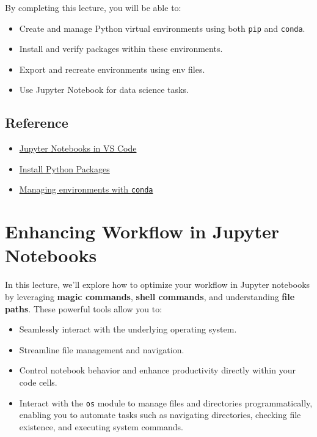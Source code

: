 \documentclass[
  letterpaper,
  DIV=11,
  numbers=noendperiod]{scrreprt}
\providecommand{\tightlist}{%
  \setlength{\itemsep}{0pt}\setlength{\parskip}{0pt}}\usepackage{longtable,booktabs,array}
\begin{document}
By completing this lecture, you will be able to:

\begin{itemize}
\tightlist
\item
  Create and manage Python virtual environments using both \texttt{pip}
  and \texttt{conda}.
\item
  Install and verify packages within these environments.
\item
  Export and recreate environments using env files.
\item
  Use Jupyter Notebook for data science tasks.
\end{itemize}

\hypertarget{reference}{%
\section{Reference}\label{reference}}

\begin{itemize}
\tightlist
\item
  \href{https://code.visualstudio.com/docs/datascience/jupyter-notebooks}{Jupyter
  Notebooks in VS Code}
\item
  \href{https://packaging.python.org/en/latest/tutorials/installing-packages/}{Install
  Python Packages}
\item
  \href{https://docs.conda.io/projects/conda/en/latest/user-guide/tasks/manage-environments.html}{Managing
  environments with \texttt{conda}}
\end{itemize}

\hypertarget{enhancing-workflow-in-jupyter-notebooks}{%
\chapter{Enhancing Workflow in Jupyter
Notebooks}\label{enhancing-workflow-in-jupyter-notebooks}}

In this lecture, we'll explore how to optimize your workflow in Jupyter
notebooks by leveraging \textbf{magic commands}, \textbf{shell
commands}, and understanding \textbf{file paths}. These powerful tools
allow you to:

\begin{itemize}
\tightlist
\item
  Seamlessly interact with the underlying operating system.
\item
  Streamline file management and navigation.
\item
  Control notebook behavior and enhance productivity directly within
  your code cells.
\item
  Interact with the \texttt{os} module to manage files and directories
  programmatically, enabling you to automate tasks such as navigating
  directories, checking file existence, and executing system commands.
\end{itemize}
\end{document}
